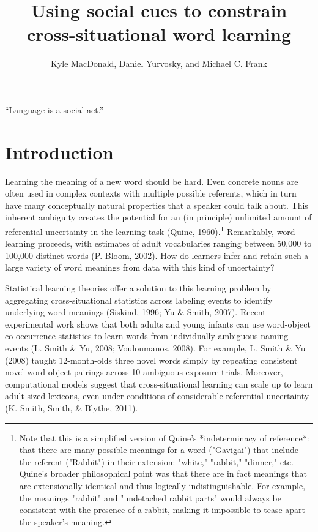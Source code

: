 \documentclass[a4paper,man,natbib]{apa6}
\date{}
\title{\textbf{Using social cues to constrain cross-situational word learning}}
\author{Kyle MacDonald, Daniel Yurvosky, and Michael C. Frank}
\affiliation{Department of Psychology, Stanford University}
\begin{document}
\maketitle

``Language is a social act.''

\section{Introduction}\label{introduction}

Learning the meaning of a new word should be hard. Even concrete nouns
are often used in complex contexts with multiple possible referents,
which in turn have many conceptually natural properties that a speaker
could talk about. This inherent ambiguity creates the potential for an
(in principle) unlimited amount of referential uncertainty in the
learning task (Quine,
1960).\footnote{Note that this is a simplified version of Quine's *indeterminacy of reference*: that there are many possible meanings for a word ("Gavigai") that include the referent ("Rabbit") in their extension: "white," "rabbit," "dinner," etc. Quine's broader philosophical point was that there are in fact meanings that are extensionally identical and thus logically indistinguishable. For example, the meanings "rabbit" and "undetached rabbit parts" would always be consistent with the presence of a rabbit, making it impossible to tease apart the speaker's meaning.}
Remarkably, word learning proceeds, with estimates of adult vocabularies
ranging between 50,000 to 100,000 distinct words (P. Bloom, 2002). How
do learners infer and retain such a large variety of word meanings from
data with this kind of uncertainty?

Statistical learning theories offer a solution to this learning problem
by aggregating cross-situational statistics across labeling events to
identify underlying word meanings (Siskind, 1996; Yu \& Smith, 2007).
Recent experimental work shows that both adults and young infants can
use word-object co-occurrence statistics to learn words from
individually ambiguous naming events (L. Smith \& Yu, 2008; Vouloumanos,
2008). For example, L. Smith \& Yu (2008) taught 12-month-olds three
novel words simply by repeating consistent novel word-object pairings
across 10 ambiguous exposure trials. Moreover, computational models
suggest that cross-situational learning can scale up to learn
adult-sized lexicons, even under conditions of considerable referential
uncertainty (K. Smith, Smith, \& Blythe, 2011).
\end{document}

